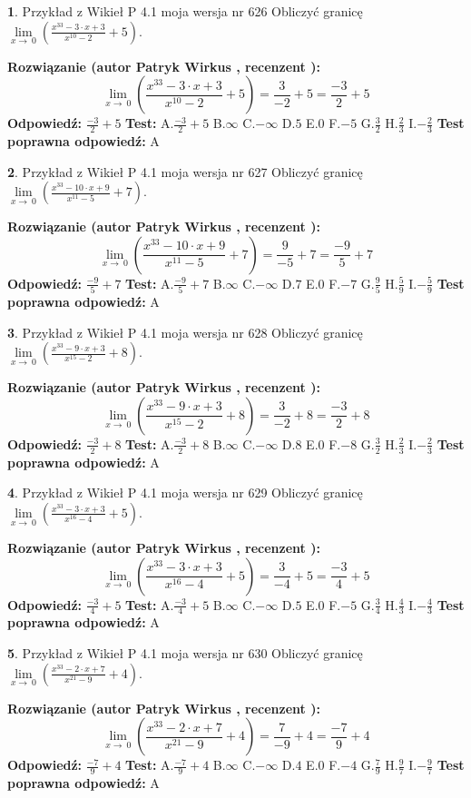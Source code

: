 \documentclass[12pt, a4paper]{article}
\theoremstyle{definition} %
\newtheorem{zad}{}
\newcommand{\zadStart}[1]{\begin{zad}#1\newline}
\newcommand{\zadStop}{\end{zad}}
\newcommand{\rozwStart}[2]{\noindent \textbf{Rozwiązanie (autor #1 , recenzent #2): }\newline}
\newcommand{\rozwStop}{\newline}
\newcommand{\odpStart}{\noindent \textbf{Odpowiedź:}\newline}
\newcommand{\odpStop}{\newline}
\newcommand{\testStart}{\noindent \textbf{Test:}\newline}
\newcommand{\testStop}{\newline}
\newcommand{\kluczStart}{\noindent \textbf{Test poprawna odpowiedź:}\newline}
\newcommand{\kluczStop}{\newline}
\begin{document}
\zadStart{Przykład z Wikieł P 4.1 moja wersja nr 626}
Obliczyć granicę $\lim\limits_{x\to\ 0}(\frac{x^{33}-3 \cdot x +3}{x^{10}-2}+5)$.
\zadStop
\rozwStart{Patryk Wirkus}{}
$$\lim\limits_{x\to\ 0}(\frac{x^{33}-3 \cdot x +3}{x^{10}-2}+5)=\frac{3}{-2}+5=\frac{-3}{2}+5$$
\rozwStop
\odpStart
$\frac{-3}{2}+5$
\odpStop
\testStart
A.$\frac{-3}{2}+5$
B.$\infty$
C.$-\infty$
D.$5$
E.$0$
F.$-5$
G.$\frac{3}{2}$
H.$\frac{2}{3}$
I.$-\frac{2}{3}$
\testStop
\kluczStart
A
\kluczStop



\zadStart{Przykład z Wikieł P 4.1 moja wersja nr 627}
Obliczyć granicę $\lim\limits_{x\to\ 0}(\frac{x^{33}-10 \cdot x +9}{x^{11}-5}+7)$.
\zadStop
\rozwStart{Patryk Wirkus}{}
$$\lim\limits_{x\to\ 0}(\frac{x^{33}-10 \cdot x +9}{x^{11}-5}+7)=\frac{9}{-5}+7=\frac{-9}{5}+7$$
\rozwStop
\odpStart
$\frac{-9}{5}+7$
\odpStop
\testStart
A.$\frac{-9}{5}+7$
B.$\infty$
C.$-\infty$
D.$7$
E.$0$
F.$-7$
G.$\frac{9}{5}$
H.$\frac{5}{9}$
I.$-\frac{5}{9}$
\testStop
\kluczStart
A
\kluczStop



\zadStart{Przykład z Wikieł P 4.1 moja wersja nr 628}
Obliczyć granicę $\lim\limits_{x\to\ 0}(\frac{x^{33}-9 \cdot x +3}{x^{15}-2}+8)$.
\zadStop
\rozwStart{Patryk Wirkus}{}
$$\lim\limits_{x\to\ 0}(\frac{x^{33}-9 \cdot x +3}{x^{15}-2}+8)=\frac{3}{-2}+8=\frac{-3}{2}+8$$
\rozwStop
\odpStart
$\frac{-3}{2}+8$
\odpStop
\testStart
A.$\frac{-3}{2}+8$
B.$\infty$
C.$-\infty$
D.$8$
E.$0$
F.$-8$
G.$\frac{3}{2}$
H.$\frac{2}{3}$
I.$-\frac{2}{3}$
\testStop
\kluczStart
A
\kluczStop



\zadStart{Przykład z Wikieł P 4.1 moja wersja nr 629}
Obliczyć granicę $\lim\limits_{x\to\ 0}(\frac{x^{33}-3 \cdot x +3}{x^{16}-4}+5)$.
\zadStop
\rozwStart{Patryk Wirkus}{}
$$\lim\limits_{x\to\ 0}(\frac{x^{33}-3 \cdot x +3}{x^{16}-4}+5)=\frac{3}{-4}+5=\frac{-3}{4}+5$$
\rozwStop
\odpStart
$\frac{-3}{4}+5$
\odpStop
\testStart
A.$\frac{-3}{4}+5$
B.$\infty$
C.$-\infty$
D.$5$
E.$0$
F.$-5$
G.$\frac{3}{4}$
H.$\frac{4}{3}$
I.$-\frac{4}{3}$
\testStop
\kluczStart
A
\kluczStop



\zadStart{Przykład z Wikieł P 4.1 moja wersja nr 630}
Obliczyć granicę $\lim\limits_{x\to\ 0}(\frac{x^{33}-2 \cdot x +7}{x^{21}-9}+4)$.
\zadStop
\rozwStart{Patryk Wirkus}{}
$$\lim\limits_{x\to\ 0}(\frac{x^{33}-2 \cdot x +7}{x^{21}-9}+4)=\frac{7}{-9}+4=\frac{-7}{9}+4$$
\rozwStop
\odpStart
$\frac{-7}{9}+4$
\odpStop
\testStart
A.$\frac{-7}{9}+4$
B.$\infty$
C.$-\infty$
D.$4$
E.$0$
F.$-4$
G.$\frac{7}{9}$
H.$\frac{9}{7}$
I.$-\frac{9}{7}$
\testStop
\kluczStart
A
\kluczStop
\end{document}
